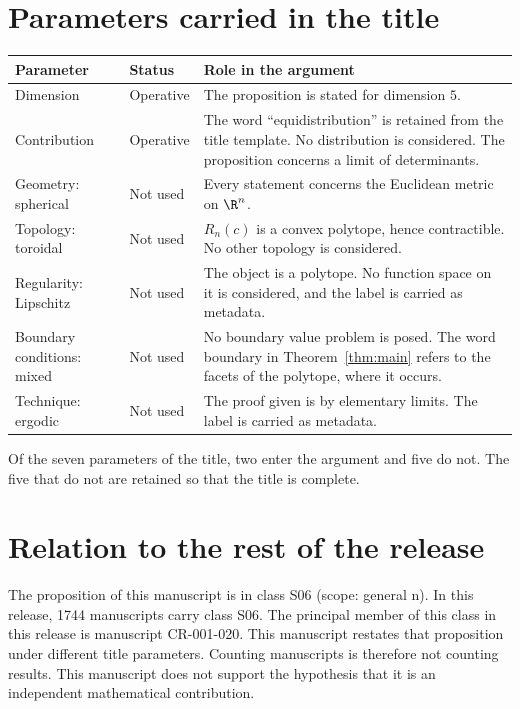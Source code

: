 \documentclass[11pt]{article}
\begin{document}
\section{Parameters carried in the title}\label{sec:params}
\begin{center}
\small
\begin{tabular}{p{}p{}p{}}
\toprule
Parameter & Status & Role in the argument \\
\midrule
Dimension & Operative & The proposition is stated for dimension $5$. \\
Contribution & Operative & The word ``equidistribution'' is retained from the title template. No distribution is considered. The proposition concerns a limit of determinants. \\
Geometry: spherical & Not used & Every statement concerns the Euclidean metric on $\R^n$. \\
Topology: toroidal & Not used & $R_n(c)$ is a convex polytope, hence contractible. No other topology is considered. \\
Regularity: Lipschitz & Not used & The object is a polytope. No function space on it is considered, and the label is carried as metadata. \\
Boundary conditions: mixed & Not used & No boundary value problem is posed. The word boundary in Theorem~\ref{thm:main} refers to the facets of the polytope, where it occurs. \\
Technique: ergodic & Not used & The proof given is by elementary limits. The label is carried as metadata. \\
\bottomrule
\end{tabular}
\end{center}
Of the seven parameters of the title, two enter the argument and five do not. The five that do not are retained so that the title is complete.

\section{Relation to the rest of the release}
The proposition of this manuscript is in class S06 (scope: general n).
In this release, 1744 manuscripts carry class S06. The principal member of this class in this release is manuscript CR-001-020. This manuscript restates that proposition under different title parameters.
Counting manuscripts is therefore not counting results. This manuscript does not support the hypothesis that it is an independent mathematical contribution.
\end{document}

